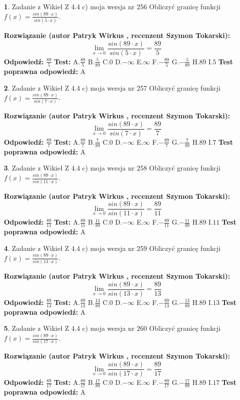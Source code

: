 \documentclass[12pt, a4paper]{article}
\theoremstyle{definition} %
\newtheorem{zad}{}
\newcommand{\zadStart}[1]{\begin{zad}#1\newline}
\newcommand{\zadStop}{\end{zad}}
\newcommand{\rozwStart}[2]{\noindent \textbf{Rozwiązanie (autor #1 , recenzent #2): }\newline}
\newcommand{\rozwStop}{\newline}
\newcommand{\odpStart}{\noindent \textbf{Odpowiedź:}\newline}
\newcommand{\odpStop}{\newline}
\newcommand{\testStart}{\noindent \textbf{Test:}\newline}
\newcommand{\testStop}{\newline}
\newcommand{\kluczStart}{\noindent \textbf{Test poprawna odpowiedź:}\newline}
\newcommand{\kluczStop}{\newline}
\begin{document}
\zadStart{Zadanie z Wikieł Z 4.4 c) moja wersja nr 256}
Obliczyć granicę funkcji $f(x)=\frac{sin(89\cdot x)}{sin(5\cdot x)}$.
\zadStop
\rozwStart{Patryk Wirkus}{Szymon Tokarski}
$$\lim\limits_{x\to 0}\frac{sin(89\cdot x)}{sin(5\cdot x)}=
\frac{89}{5}$$
\rozwStop
\odpStart
$\frac{89}{5}$
\odpStop
\testStart
A.$\frac{89}{5}$
B.$\frac{5}{89}$
C.$0$
D.$-\infty$
E.$\infty$
F.$-\frac{89}{5}$
G.$-\frac{5}{89}$
H.$89$
I.$5$
\testStop
\kluczStart
A
\kluczStop



\zadStart{Zadanie z Wikieł Z 4.4 c) moja wersja nr 257}
Obliczyć granicę funkcji $f(x)=\frac{sin(89\cdot x)}{sin(7\cdot x)}$.
\zadStop
\rozwStart{Patryk Wirkus}{Szymon Tokarski}
$$\lim\limits_{x\to 0}\frac{sin(89\cdot x)}{sin(7\cdot x)}=
\frac{89}{7}$$
\rozwStop
\odpStart
$\frac{89}{7}$
\odpStop
\testStart
A.$\frac{89}{7}$
B.$\frac{7}{89}$
C.$0$
D.$-\infty$
E.$\infty$
F.$-\frac{89}{7}$
G.$-\frac{7}{89}$
H.$89$
I.$7$
\testStop
\kluczStart
A
\kluczStop



\zadStart{Zadanie z Wikieł Z 4.4 c) moja wersja nr 258}
Obliczyć granicę funkcji $f(x)=\frac{sin(89\cdot x)}{sin(11\cdot x)}$.
\zadStop
\rozwStart{Patryk Wirkus}{Szymon Tokarski}
$$\lim\limits_{x\to 0}\frac{sin(89\cdot x)}{sin(11\cdot x)}=
\frac{89}{11}$$
\rozwStop
\odpStart
$\frac{89}{11}$
\odpStop
\testStart
A.$\frac{89}{11}$
B.$\frac{11}{89}$
C.$0$
D.$-\infty$
E.$\infty$
F.$-\frac{89}{11}$
G.$-\frac{11}{89}$
H.$89$
I.$11$
\testStop
\kluczStart
A
\kluczStop



\zadStart{Zadanie z Wikieł Z 4.4 c) moja wersja nr 259}
Obliczyć granicę funkcji $f(x)=\frac{sin(89\cdot x)}{sin(13\cdot x)}$.
\zadStop
\rozwStart{Patryk Wirkus}{Szymon Tokarski}
$$\lim\limits_{x\to 0}\frac{sin(89\cdot x)}{sin(13\cdot x)}=
\frac{89}{13}$$
\rozwStop
\odpStart
$\frac{89}{13}$
\odpStop
\testStart
A.$\frac{89}{13}$
B.$\frac{13}{89}$
C.$0$
D.$-\infty$
E.$\infty$
F.$-\frac{89}{13}$
G.$-\frac{13}{89}$
H.$89$
I.$13$
\testStop
\kluczStart
A
\kluczStop



\zadStart{Zadanie z Wikieł Z 4.4 c) moja wersja nr 260}
Obliczyć granicę funkcji $f(x)=\frac{sin(89\cdot x)}{sin(17\cdot x)}$.
\zadStop
\rozwStart{Patryk Wirkus}{Szymon Tokarski}
$$\lim\limits_{x\to 0}\frac{sin(89\cdot x)}{sin(17\cdot x)}=
\frac{89}{17}$$
\rozwStop
\odpStart
$\frac{89}{17}$
\odpStop
\testStart
A.$\frac{89}{17}$
B.$\frac{17}{89}$
C.$0$
D.$-\infty$
E.$\infty$
F.$-\frac{89}{17}$
G.$-\frac{17}{89}$
H.$89$
I.$17$
\testStop
\kluczStart
A
\kluczStop
\end{document}
